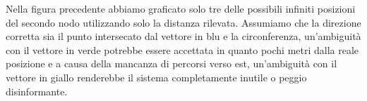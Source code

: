Nella figura precedente abbiamo graficato solo tre delle possibili infiniti posizioni del secondo nodo utilizzando solo la distanza rilevata. Assumiamo che la direzione corretta sia il punto intersecato dal vettore in blu e la circonferenza, un'ambiguità con il vettore in verde potrebbe essere accettata in quanto pochi metri dalla reale posizione e a causa della mancanza di percorsi verso est, un'ambiguità con il vettore in giallo renderebbe il sistema completamente inutile o peggio disinformante.  

